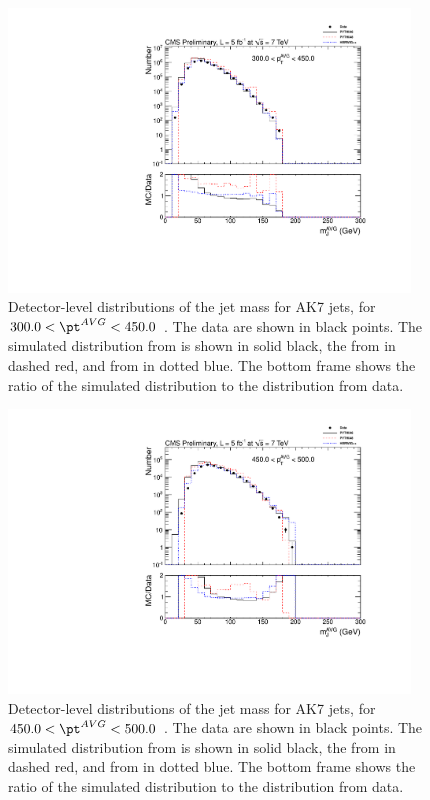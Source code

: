 \begin{figure}[htbp]
\centering
\includegraphics[width=0.95\textwidth]{figs/histAK7MjetVsPtAvg_rawDataMCComparisons_pt_5}
\caption{Detector-level distributions of the jet mass for AK7 jets,
for $300.0 < \pt^{AVG} < 450.0$ \GeVc. The data are shown in black points.
The simulated distribution from \PYTHIA is shown in solid black, 
the from \PYTHIAEIGHT in dashed red, and from \HERWIG in dotted blue. 
The bottom frame shows the ratio of the simulated distribution
to the distribution from data. 
\label{figs:histAK7MjetVsPtAvg_rawDataMCComparisons_pt_5}}
\end{figure}
\fi


\ifnpas

\begin{figure}[htbp]
\centering
\includegraphics[width=0.95\textwidth]{figs/histAK7MjetVsPtAvg_rawDataMCComparisons_pt_6}
\caption{Detector-level distributions of the jet mass for AK7 jets,
for $450.0 < \pt^{AVG} < 500.0$ \GeVc. The data are shown in black points.
The simulated distribution from \PYTHIA is shown in solid black, 
the from \PYTHIAEIGHT in dashed red, and from \HERWIG in dotted blue. 
The bottom frame shows the ratio of the simulated distribution
to the distribution from data. 
\label{figs:histAK7MjetVsPtAvg_rawDataMCComparisons_pt_6}}
\end{figure}



